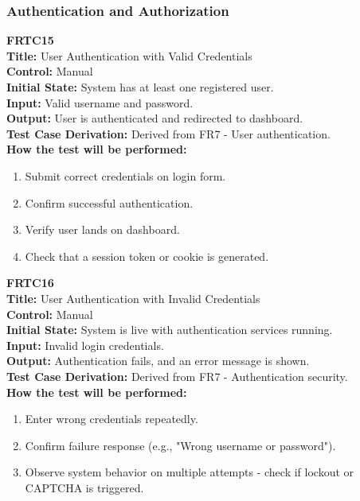 \documentclass[12pt, titlepage]{article}
\begin{document}
\vspace{1em}

\subsubsection{Authentication and Authorization}

\textbf{FRTC15}\\
\textbf{Title:} User Authentication with Valid Credentials\\
\textbf{Control:} Manual\\
\textbf{Initial State:} System has at least one registered user.\\
\textbf{Input:} Valid username and password.\\
\textbf{Output:} User is authenticated and redirected to dashboard.\\
\textbf{Test Case Derivation:} Derived from FR7 - User authentication.\\
\textbf{How the test will be performed:}
\begin{enumerate}
  \item Submit correct credentials on login form.
  \item Confirm successful authentication.
  \item Verify user lands on dashboard.
  \item Check that a session token or cookie is generated.
\end{enumerate}

\vspace{1em}

\textbf{FRTC16}\\
\textbf{Title:} User Authentication with Invalid Credentials\\
\textbf{Control:} Manual\\
\textbf{Initial State:} System is live with authentication services running.\\
\textbf{Input:} Invalid login credentials.\\
\textbf{Output:} Authentication fails, and an error message is shown.\\
\textbf{Test Case Derivation:} Derived from FR7 - Authentication security.\\
\textbf{How the test will be performed:}
\begin{enumerate}
  \item Enter wrong credentials repeatedly.
  \item Confirm failure response (e.g., "Wrong username or password").
  \item Observe system behavior on multiple attempts - check if lockout or CAPTCHA is triggered.
\end{enumerate}
\end{document}
